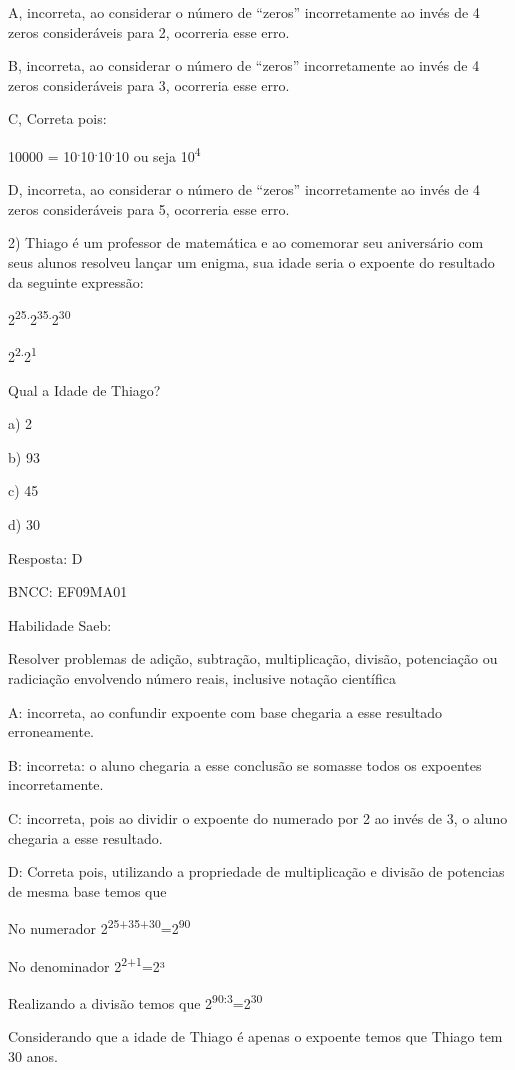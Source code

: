 {A, incorreta, ao considerar o número de ``zeros'' incorretamente ao
invés de 4 zeros consideráveis para 2, ocorreria esse erro.

B, incorreta, ao considerar o número de ``zeros'' incorretamente ao
invés de 4 zeros consideráveis para 3, ocorreria esse erro.

C, Correta pois:

10000 =
10\textsuperscript{.}10\textsuperscript{.}10\textsuperscript{.}10 ou
seja 10\textsuperscript{4}

D, incorreta, ao considerar o número de ``zeros'' incorretamente ao
invés de 4 zeros consideráveis para 5, ocorreria esse erro.

2) Thiago é um professor de matemática e ao comemorar seu aniversário
com seus alunos resolveu lançar um enigma, sua idade seria o expoente do
resultado da seguinte expressão:

2\textsuperscript{25.}2\textsuperscript{35.}2\textsuperscript{30}

2\textsuperscript{2.}2\textsuperscript{1}

Qual a Idade de Thiago?

a) 2

b) 93

c) 45

d) 30

Resposta: D

BNCC: EF09MA01

Habilidade Saeb:

Resolver problemas de adição, subtração, multiplicação, divisão,
potenciação ou radiciação envolvendo número reais, inclusive notação
científica

A: incorreta, ao confundir expoente com base chegaria a esse resultado
erroneamente.

B: incorreta: o aluno chegaria a esse conclusão se somasse todos os
expoentes incorretamente.

C: incorreta, pois ao dividir o expoente do numerado por 2 ao invés de
3, o aluno chegaria a esse resultado.

D: Correta pois, utilizando a propriedade de multiplicação e divisão de
potencias de mesma base temos que

No numerador 2\textsuperscript{25+35+30}=2\textsuperscript{90}

No denominador 2\textsuperscript{2+1}=2³

Realizando a divisão temos que
2\textsuperscript{90:3}=2\textsuperscript{30}

Considerando que a idade de Thiago é apenas o expoente temos que Thiago
tem 30 anos.

}
